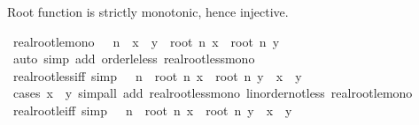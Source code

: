 \begin{isabellebody}
\endisatagproof
{\isafoldproof}%
%
\isadelimproof
%
\endisadelimproof
%
\begin{isamarkuptext}%
Root function is strictly monotonic, hence injective.%
\end{isamarkuptext}\isamarkuptrue%
\isamarkupfalse%
\ real{\isacharunderscore}{\kern0pt}root{\isacharunderscore}{\kern0pt}le{\isacharunderscore}{\kern0pt}mono{\isacharcolon}{\kern0pt}\ {\isachardoublequoteopen}{}\ {\isacharless}{\kern0pt}\ n\ {\isasymLongrightarrow}\ x\ {\isasymle}\ y\ {\isasymLongrightarrow}\ root\ n\ x\ {\isasymle}\ root\ n\ y{\isachardoublequoteclose}\isanewline
%
\isadelimproof
\ \ %
\endisadelimproof
%
\isatagproof
{}\isamarkupfalse%
\ {\isacharparenleft}{\kern0pt}auto\ simp\ add{\isacharcolon}{\kern0pt}\ order{\isacharunderscore}{\kern0pt}le{\isacharunderscore}{\kern0pt}less\ real{\isacharunderscore}{\kern0pt}root{\isacharunderscore}{\kern0pt}less{\isacharunderscore}{\kern0pt}mono{\isacharparenright}{\kern0pt}%
\endisatagproof
{\isafoldproof}%
%
\isadelimproof
\isanewline
%
\endisadelimproof
\isanewline
{}\isamarkupfalse%
\ real{\isacharunderscore}{\kern0pt}root{\isacharunderscore}{\kern0pt}less{\isacharunderscore}{\kern0pt}iff\ {\isacharbrackleft}{\kern0pt}simp{\isacharbrackright}{\kern0pt}{\isacharcolon}{\kern0pt}\ {\isachardoublequoteopen}{}\ {\isacharless}{\kern0pt}\ n\ {\isasymLongrightarrow}\ root\ n\ x\ {\isacharless}{\kern0pt}\ root\ n\ y\ {\isasymlongleftrightarrow}\ x\ {\isacharless}{\kern0pt}\ y{\isachardoublequoteclose}\isanewline
%
\isadelimproof
\ \ %
\endisadelimproof
%
\isatagproof
{}\isamarkupfalse%
\ {\isacharparenleft}{\kern0pt}cases\ {\isachardoublequoteopen}x\ {\isacharless}{\kern0pt}\ y{\isachardoublequoteclose}{\isacharparenright}{\kern0pt}\ {\isacharparenleft}{\kern0pt}simp{\isacharunderscore}{\kern0pt}all\ add{\isacharcolon}{\kern0pt}\ real{\isacharunderscore}{\kern0pt}root{\isacharunderscore}{\kern0pt}less{\isacharunderscore}{\kern0pt}mono\ linorder{\isacharunderscore}{\kern0pt}not{\isacharunderscore}{\kern0pt}less\ real{\isacharunderscore}{\kern0pt}root{\isacharunderscore}{\kern0pt}le{\isacharunderscore}{\kern0pt}mono{\isacharparenright}{\kern0pt}%
\endisatagproof
{\isafoldproof}%
%
\isadelimproof
\isanewline
%
\endisadelimproof
\isanewline
{}\isamarkupfalse%
\ real{\isacharunderscore}{\kern0pt}root{\isacharunderscore}{\kern0pt}le{\isacharunderscore}{\kern0pt}iff\ {\isacharbrackleft}{\kern0pt}simp{\isacharbrackright}{\kern0pt}{\isacharcolon}{\kern0pt}\ {\isachardoublequoteopen}{}\ {\isacharless}{\kern0pt}\ n\ {\isasymLongrightarrow}\ root\ n\ x\ {\isasymle}\ root\ n\ y\ {\isasymlongleftrightarrow}\ x\ {\isasymle}\ y{\isachardoublequoteclose}\isanewline

\end{isabellebody}
